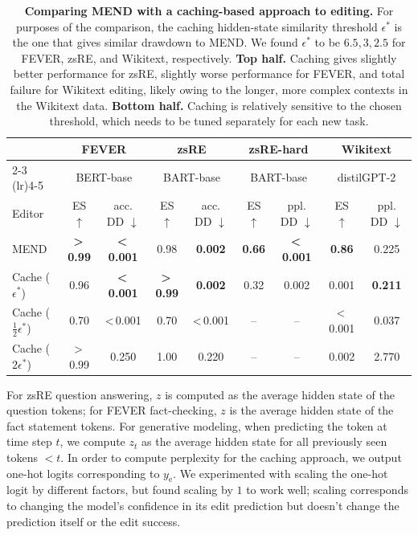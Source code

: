 \documentclass{article}
\newcommand{\name}{MEND}
\newcommand{\ye}{y_\text{e}}
\newcommand{\rebuttal}[1]{#1}
\newcommand{\textlt}[1]{\textless\,#1\phantom{\textless\,}}
\newcommand{\textgt}[1]{\textgreater\,#1\phantom{\textgreater\,}}
\begin{document}
\begin{appendix}
\begin{table}
    \centering
    \small
    \begin{tabular}{lcccccccc}
    \toprule
        & \multicolumn{2}{c}{\textbf{FEVER}} & \multicolumn{2}{c}{\textbf{zsRE}} &  \multicolumn{2}{c}{\textbf{zsRE-hard}} & \multicolumn{2}{c}{\textbf{Wikitext}}  \\
        \cmidrule(lr){2-3} \cmidrule(lr){4-5} \cmidrule{6-7} \cmidrule{8-9}
        & \multicolumn{2}{c}{BERT-base} & \multicolumn{2}{c}{BART-base} & \multicolumn{2}{c}{BART-base} & \multicolumn{2}{c}{distilGPT-2} \\
        \midrule
        Editor & ES $\uparrow$ & acc. DD $\downarrow$ & ES $\uparrow$ & acc. DD $\downarrow$ & ES $\uparrow$ & ppl. DD $\downarrow$ & ES $\uparrow$ & ppl. DD $\downarrow$ \\
        \midrule
        \name & \textbf{\textgt{0.99}} & \textbf{\textlt{0.001}} & 0.98 & \textbf{0.002} & \textbf{0.66} & \textbf{\textlt{0.001}} & \textbf{0.86} & 0.225 \\
        Cache ($\epsilon^*$) & 0.96 & \textbf{\textlt{0.001}} & \textbf{\textgt{0.99}} & \textbf{0.002} & 0.32 & 0.002 & 0.001 & \textbf{0.211} \\
        \midrule
        Cache ($\frac{1}{2}\epsilon^*$) & 0.70 & \textlt{0.001} & 0.70 & \textlt{0.001} & -- & -- & \textlt{0.001} & 0.037 \\
        Cache ($2\epsilon^*$) & \textgt{0.99} & 0.250 & 1.00 & 0.220 & -- & -- & 0.002 & 2.770 \\
        \bottomrule
    \end{tabular}
    \caption{\rebuttal{\textbf{Comparing {\name} with a caching-based approach to editing.} For purposes of the comparison, the caching hidden-state similarity threshold $\epsilon^*$ is the one that gives similar drawdown to \name. We found $\epsilon^*$ to be $6.5, 3, 2.5$ for FEVER, zsRE, and Wikitext, respectively. \textbf{Top half.} Caching gives slightly better performance for zsRE, slightly worse performance for FEVER, and total failure for Wikitext editing, likely owing to the longer, more complex contexts in the Wikitext data. \textbf{Bottom half.} Caching is relatively sensitive to the chosen threshold, which needs to be tuned separately for each new task.}}
    \label{tab:caching}
\end{table}


For zsRE question answering, $z$ is computed as the average hidden state of the question tokens; for FEVER fact-checking, $z$ is the average hidden state of the fact statement tokens. For generative modeling, when predicting the token at time step $t$, we compute $z_t$ as the average hidden state for all previously seen tokens $<t$. In order to compute perplexity for the caching approach, we output one-hot logits corresponding to $\ye$. We experimented with scaling the one-hot logit by different factors, but found scaling by $1$ to work well; scaling corresponds to changing the model's confidence in its edit prediction but doesn't change the prediction itself or the edit success. 

\end{appendix}
\end{document}
